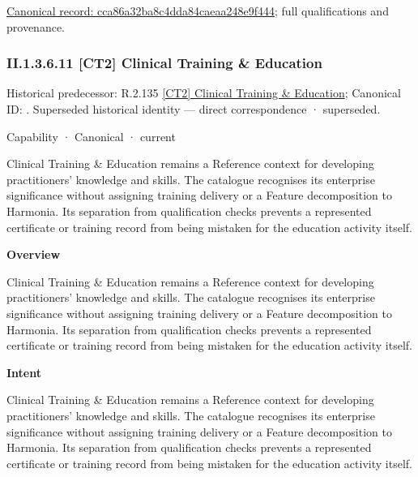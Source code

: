 {\footnotesize \href{../../../../continuum/strategy/capability/cca86a32ba8c4dda84caeaa248e9f444.md}{Canonical record: cca86a32ba8c4dda84caeaa248e9f444}; full qualifications and provenance.}\par
\subsubsection*{II.1.3.6.11 [CT2] Clinical Training \& Education}
\label{navigation:II.1.3.6.11}

{\small Historical predecessor: R.2.135 \hyperref[element:df8bff7df9c1469da16cac6a5eb2bf76]{[CT2] Clinical Training \& Education}; Canonical ID: \texttt{}. Superseded historical identity — direct correspondence · superseded.}\par
\label{element:d016f35ffbc345d99d7281e968c14ddb}
{\small Capability · Canonical · current}\par

Clinical Training \& Education remains a Reference context for developing practitioners' knowledge and skills. The catalogue recognises its enterprise significance without assigning training delivery or a Feature decomposition to Harmonia. Its separation from qualification checks prevents a represented certificate or training record from being mistaken for the education activity itself.



\textbf{Overview}



Clinical Training \& Education remains a Reference context for developing practitioners' knowledge and skills. The catalogue recognises its enterprise significance without assigning training delivery or a Feature decomposition to Harmonia. Its separation from qualification checks prevents a represented certificate or training record from being mistaken for the education activity itself.



\textbf{Intent}



Clinical Training \& Education remains a Reference context for developing practitioners' knowledge and skills. The catalogue recognises its enterprise significance without assigning training delivery or a Feature decomposition to Harmonia. Its separation from qualification checks prevents a represented certificate or training record from being mistaken for the education activity itself.



